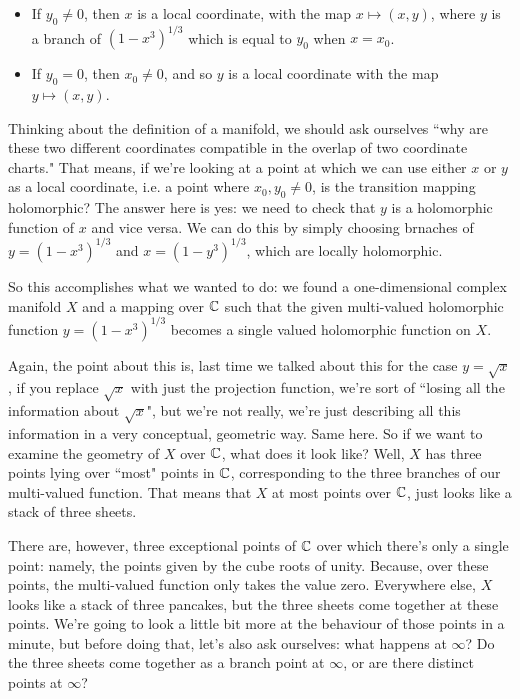 \documentclass{article}
\begin{document}
\begin{enumerate}
\begin{itemize}
    \item If \(y_0 \neq 0\), then \(x\) is a local coordinate, with the map \(x \mapsto (x, y)\), where \(y\) is a branch of \((1 - x^3)^{1/3}\) which is equal to \(y_0\) when \(x = x_0\).

    \item If \(y_0 = 0\), then \(x_0 \neq 0\), and so \(y\) is a local coordinate with the map \(y \mapsto (x, y)\).

  \end{itemize}
  Thinking about the definition of a manifold, we should ask ourselves ``why are these two different coordinates compatible in the overlap of two coordinate charts." That means, if we're looking at a point at which we can use either \(x\) or \(y\) as a local coordinate, i.e. a point where \(x_0, y_0 \neq 0\), is the transition mapping holomorphic? The answer here is yes: we need to check that \(y\) is a holomorphic function of \(x\) and vice versa. We can do this by simply choosing brnaches of \(y = (1 - x^3)^{1/3}\) and \(x = (1 - y^3)^{1/3}\), which are locally holomorphic.

  So this accomplishes what we wanted to do: we found a one-dimensional complex manifold \(X\) and a mapping over \(\mathbb{C}\) such that the given multi-valued holomorphic function \(y = (1 - x^3)^{1/3}\) becomes a single valued holomorphic function on \(X\).

  Again, the point about this is, last time we talked about this for the case \(y = \sqrt{x}\), if you replace \(\sqrt{x}\) with just the projection function, we're sort of ``losing all the information about \(\sqrt{x}\)", but we're not really, we're just describing all this information in a very conceptual, geometric way. Same here. So if we want to examine the geometry of \(X\) over \(\mathbb{C}\), what does it look like? Well, \(X\) has three points lying over ``most" points in \(\mathbb{C}\), corresponding to the three branches of our multi-valued function. That means that \(X\) at most points over \(\mathbb{C}\), just looks like a stack of three sheets.

  There are, however, three exceptional points of \(\mathbb{C}\) over which there's only a single point: namely, the points given by the cube roots of unity. Because, over these points, the multi-valued function only takes the value zero. Everywhere else, \(X\) looks like a stack of three pancakes, but the three sheets come together at these points. We're going to look a little bit more at the behaviour of those points in a minute, but before doing that, let's also ask ourselves: what happens at \(\infty\)? Do the three sheets come together as a branch point at \(\infty\), or are there distinct points at \(\infty\)?


\end{enumerate}
\end{document}
